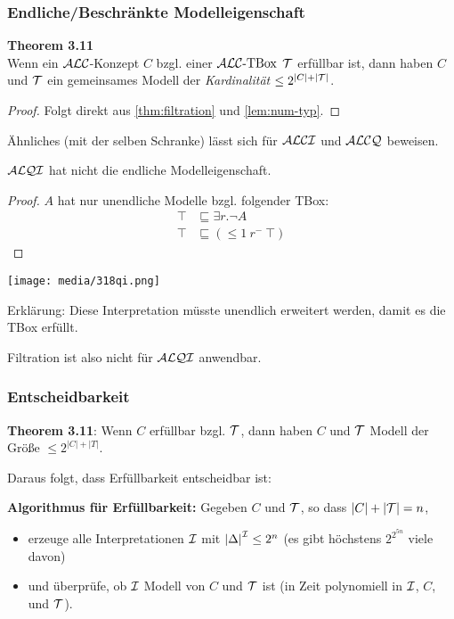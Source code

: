 \subsubsection{Endliche/Beschränkte Modelleigenschaft}

\textbf{Theorem 3.11} \\
Wenn ein $\mathcal{A}\mathcal{L}\mathcal{C}$-Konzept $C$ bzgl. einer $\text{$\mathcal{A}\mathcal{L}\mathcal{C}$-TBox}$ $\mathcal{T}$ erfüllbar ist, dann haben $C$ und $\mathcal{T}$ ein gemeinsames Modell der
\emph{Kardinalität} $\leq 2^{\left| C \right| + |\MT|}$.

\begin{proof}
    Folgt direkt aus \autoref{thm:filtration} und \autoref{lem:num-typ}.
\end{proof}

Ähnliches (mit der selben Schranke) lässt sich für $\mathcal{A}\mathcal{L}\mathcal{C}\mathcal{I}$ und $\mathcal{A}\mathcal{L}\mathcal{C}\mathcal{Q}$ beweisen.

\begin{theorem}
$\mathcal{A}\mathcal{L}\mathcal{Q}\mathcal{I}$ hat nicht die endliche Modelleigenschaft.
\end{theorem}

\begin{proof}
    $A$ hat nur unendliche Modelle bzgl. folgender TBox:
    \begin{align*}
        \top &\sqsubseteq \exists r.\neg A\\
        \top &\sqsubseteq ( \leq 1\ r^{-}\ \top)
    \end{align*}
\end{proof}
\begin{tafel}\mbox{}

\texttt{[image: media/318qi.png]}

Erklärung: Diese Interpretation müsste unendlich erweitert werden, damit es die TBox erfüllt.
\end{tafel}

Filtration ist also nicht für $\mathcal{A}\mathcal{L}\mathcal{Q}\mathcal{I}$ anwendbar.

\subsubsection{Entscheidbarkeit}
\textbf{Theorem 3.11}:
Wenn $C$ erfüllbar bzgl. $\mathcal{T}$, dann haben $C$ und $\mathcal{T}$ Modell der
Größe $\leq 2^{\left| C \right| + \left| T \right|}$.

Daraus folgt, dass Erfüllbarkeit entscheidbar ist:

\textbf{Algorithmus für Erfüllbarkeit:}
Gegeben $C$ und $\mathcal{T}$, so dass $|C|+|\mathcal{T}| = n$,
\begin{itemize} 
  \item erzeuge alle Interpretationen $\mathcal{I}$ mit $\left| \Delta \right|^\MI \leq 2^{n}$ (es gibt höchstens $2^{2^{5n}}$ viele davon) 
  \item und überprüfe, ob $\mathcal{I}$ Modell von $C$ und $\mathcal{T}$ ist (in Zeit polynomiell in $\mathcal{I}$, $C$, und $\mathcal{T}$).
\end{itemize}

